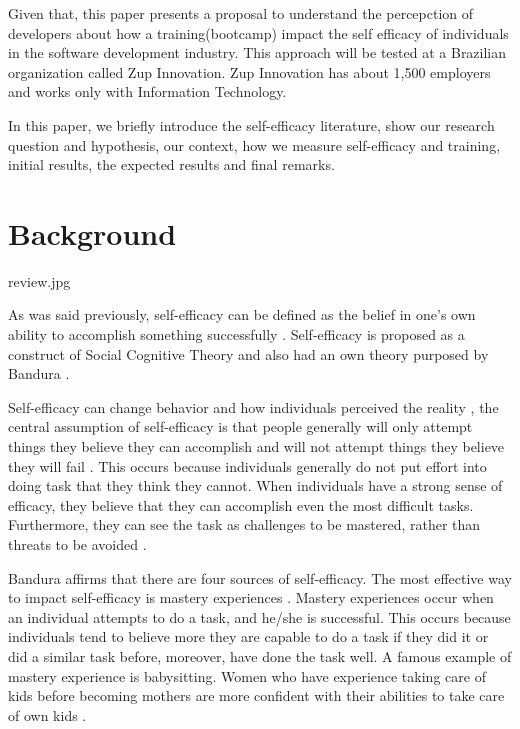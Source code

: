\documentclass{TheMartianReport}
\begin{document}
Given that, this paper presents a proposal to understand the percepction of developers about how a training(bootcamp) impact the self efficacy of individuals in the software development industry. This approach will be tested at a Brazilian organization called Zup Innovation. Zup Innovation has about 1,500 employers and works only with Information Technology. 

In this paper, we briefly introduce the self-efficacy literature, show our research question and hypothesis, our context, how we measure self-efficacy and training, initial results, the expected results and final remarks.



\section{Background}{review.jpg}

As was said previously, self-efficacy can be defined as the belief in one's own ability to accomplish something successfully  \cite{bandura1977self}. Self-efficacy is proposed as a construct of Social Cognitive Theory \cite{bandura1977social} and also had an own theory purposed by Bandura \cite{bandura1977self}. 

Self-efficacy can change behavior and how individuals perceived the reality \cite{bandura2010self}, the central assumption of self-efficacy is that people generally will only attempt things they believe they can accomplish and will not attempt things they believe they will fail \cite{bandura1977self}. This occurs because individuals generally do not put effort into doing task that they think they cannot. When individuals have a strong sense of efficacy, they believe that they can accomplish even the most difficult tasks. Furthermore, they can see the task as challenges to be mastered, rather than threats to be avoided \cite{bandura1994ramachaudran}.

Bandura affirms that there are four sources of self-efficacy. The most effective way to impact self-efficacy is mastery experiences \cite{bandura1994ramachaudran}. Mastery experiences occur when an individual attempts to do a task, and he/she is successful. This occurs because individuals tend to believe more they are capable to do a task if they did it or did a similar task before,  moreover, have done the task well. A famous example of mastery experience is babysitting. Women who have experience taking care of kids before becoming mothers are more confident with their abilities to take care of own kids \cite{froman1989infant}.
\end{document}
